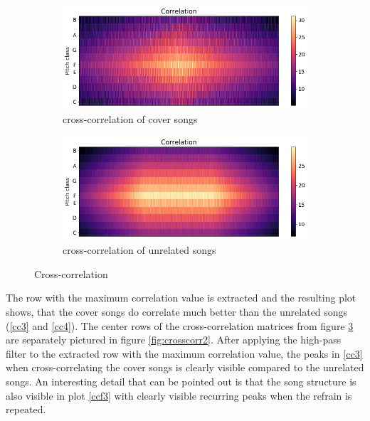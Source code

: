 \begin{figure}[htbp]
{{			\begin{subfigure}{.495\textwidth}
				\centering    
				\includegraphics[scale=0.3]{Images/Chroma/cross_hurricane.png}
				\caption{cross-correlation of cover songs}
				\label{cc1}
			\end{subfigure}		
			\begin{subfigure}{.495\textwidth}
				\centering     
				\includegraphics[scale=0.3]{Images/Chroma/cross_hurricane_sia.png}
				\caption{cross-correlation of unrelated songs}
				\label{cc2}
			\end{subfigure}%
	}}
	\caption{Cross-correlation}
	\label{fig:crosscorr}
\end{figure}
The row with the maximum correlation value is extracted and the resulting plot shows, that the cover songs do correlate much better than the unrelated songs (\ref{cc3} and \ref{cc4}).
The center rows of the cross-correlation matrices from figure \ref{fig:crosscorr} are separately pictured in figure \ref{fig:crosscorr2}. After applying the high-pass filter to the extracted row with the maximum correlation value, the peaks in \ref{cc3} when cross-correlating the cover songs is clearly visible compared to the unrelated songs. An interesting detail that can be pointed out is that the song structure is also visible in plot \ref{ccf3} with clearly visible recurring peaks when the refrain is repeated.

